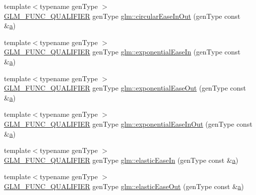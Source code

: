 \begin{DoxyCompactItemize}
\item 
{\footnotesize template$<$typename gen\+Type $>$ }\\\hyperlink{setup_8hpp_a33fdea6f91c5f834105f7415e2a64407}{G\+L\+M\+\_\+\+F\+U\+N\+C\+\_\+\+Q\+U\+A\+L\+I\+F\+I\+ER} gen\+Type \hyperlink{group__gtx__easing_ga0c1027637a5b02d4bb3612aa12599d69}{glm\+::circular\+Ease\+In\+Out} (gen\+Type const \&\hyperlink{_s_d_l__opengl__glext_8h_a3309789fc188587d666cda5ece79cf82}{a})
\item 
{\footnotesize template$<$typename gen\+Type $>$ }\\\hyperlink{setup_8hpp_a33fdea6f91c5f834105f7415e2a64407}{G\+L\+M\+\_\+\+F\+U\+N\+C\+\_\+\+Q\+U\+A\+L\+I\+F\+I\+ER} gen\+Type \hyperlink{group__gtx__easing_ga7f24ee9219ab4c84dc8de24be84c1e3c}{glm\+::exponential\+Ease\+In} (gen\+Type const \&\hyperlink{_s_d_l__opengl__glext_8h_a3309789fc188587d666cda5ece79cf82}{a})
\item 
{\footnotesize template$<$typename gen\+Type $>$ }\\\hyperlink{setup_8hpp_a33fdea6f91c5f834105f7415e2a64407}{G\+L\+M\+\_\+\+F\+U\+N\+C\+\_\+\+Q\+U\+A\+L\+I\+F\+I\+ER} gen\+Type \hyperlink{group__gtx__easing_ga517f2bcfd15bc2c25c466ae50808efc3}{glm\+::exponential\+Ease\+Out} (gen\+Type const \&\hyperlink{_s_d_l__opengl__glext_8h_a3309789fc188587d666cda5ece79cf82}{a})
\item 
{\footnotesize template$<$typename gen\+Type $>$ }\\\hyperlink{setup_8hpp_a33fdea6f91c5f834105f7415e2a64407}{G\+L\+M\+\_\+\+F\+U\+N\+C\+\_\+\+Q\+U\+A\+L\+I\+F\+I\+ER} gen\+Type \hyperlink{group__gtx__easing_ga232fb6dc093c5ce94bee105ff2947501}{glm\+::exponential\+Ease\+In\+Out} (gen\+Type const \&\hyperlink{_s_d_l__opengl__glext_8h_a3309789fc188587d666cda5ece79cf82}{a})
\item 
{\footnotesize template$<$typename gen\+Type $>$ }\\\hyperlink{setup_8hpp_a33fdea6f91c5f834105f7415e2a64407}{G\+L\+M\+\_\+\+F\+U\+N\+C\+\_\+\+Q\+U\+A\+L\+I\+F\+I\+ER} gen\+Type \hyperlink{group__gtx__easing_ga230918eccee4e113d10ec5b8cdc58695}{glm\+::elastic\+Ease\+In} (gen\+Type const \&\hyperlink{_s_d_l__opengl__glext_8h_a3309789fc188587d666cda5ece79cf82}{a})
\item 
{\footnotesize template$<$typename gen\+Type $>$ }\\\hyperlink{setup_8hpp_a33fdea6f91c5f834105f7415e2a64407}{G\+L\+M\+\_\+\+F\+U\+N\+C\+\_\+\+Q\+U\+A\+L\+I\+F\+I\+ER} gen\+Type \hyperlink{group__gtx__easing_gace9c9d1bdf88bf2ab1e7cdefa54c7365}{glm\+::elastic\+Ease\+Out} (gen\+Type const \&\hyperlink{_s_d_l__opengl__glext_8h_a3309789fc188587d666cda5ece79cf82}{a})

\end{DoxyCompactItemize}
